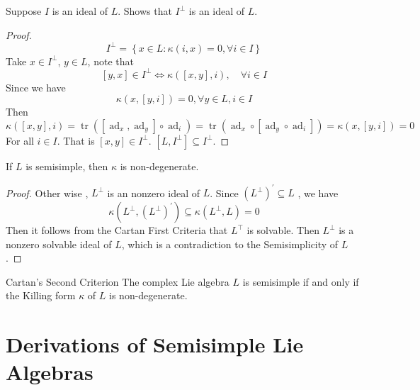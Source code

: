 \documentclass[../main.tex]{subfiles}
\begin{document}
\begin{exercise}{}{}
    Suppose \(  I  \) is an ideal of \(  L  \). Shows that \(  I^{\perp} \) is an ideal of \(  L  \).   
\end{exercise}

\begin{proof}
      \[
      I^{\perp}= \left\{ x \in L:   \kappa \left( i,x  \right)= 0, \forall i \in I  \right\}
      \]Take \(  x \in I^{\perp}  \),   \(  y \in L  \),  note that \[
      \left[ y,x \right]\in I^{\perp}\iff  \kappa \left( \left[ x,y \right], i  \right), \quad \forall i \in I  
      \] Since we have \[
      \kappa \left( x,\left[ y, i \right]  \right)= 0 , \forall y \in L, i \in I 
      \] Then  \[
       \kappa \left( [x,y],i \right)= \operatorname{tr} \left( \left[ \operatorname{ad}_{x}, \operatorname{ad}_{y} \right]  \circ \operatorname{ad}_{i}\right)= \operatorname{tr}\left( \operatorname{ad}_{x}\circ \left[ \operatorname{ad}_{y}\circ \operatorname{ad}_{i} \right]  \right)=  \kappa \left( x,\left[ y,i \right]  \right)= 0    
      \] For all \(  i \in I  \). That is \(  \left[ x,y \right]\in I^{\perp}   \). \(  \left[ L, I^{\perp} \right]\subseteq I^{\perp}   \).   
\end{proof}

\begin{corollary}{}{}
    If  \(  L  \)  is semisimple, then \(   \kappa   \) is non-degenerate. 
\end{corollary}

\begin{proof}
    Other wise , \(  L^{\perp}  \) is an nonzero ideal of \(  L  \). Since \(  \left( L^{\perp} \right)^{\prime} \subseteq  L  \)   , we have \[
     \kappa \left( L^{\perp}, \left( L^{\perp} \right)^{\prime}   \right)\subseteq  \kappa \left( L^{\perp}, L \right)= 0  
    \] Then it follows from the Cartan First Criteria that \(  L^{\top}  \) is solvable. Then \(  L^{\perp}  \) is a nonzero solvable   ideal of \(  L  \), which is a contradiction to the Semisimplicity of \(  L  \).  
\end{proof}

\begin{theorem}{Cartan's Second Criterion}{}
The complex Lie algebra $L$ is semisimple if and only if the Killing form $\kappa$ of $L$ is non-degenerate.
\end{theorem}

\section{Derivations of Semisimple Lie Algebras}
\end{document}
